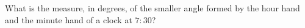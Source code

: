 What is the measure, in degrees, of the smaller angle formed by the hour hand and the minute hand of a clock at $7{:}30$?
